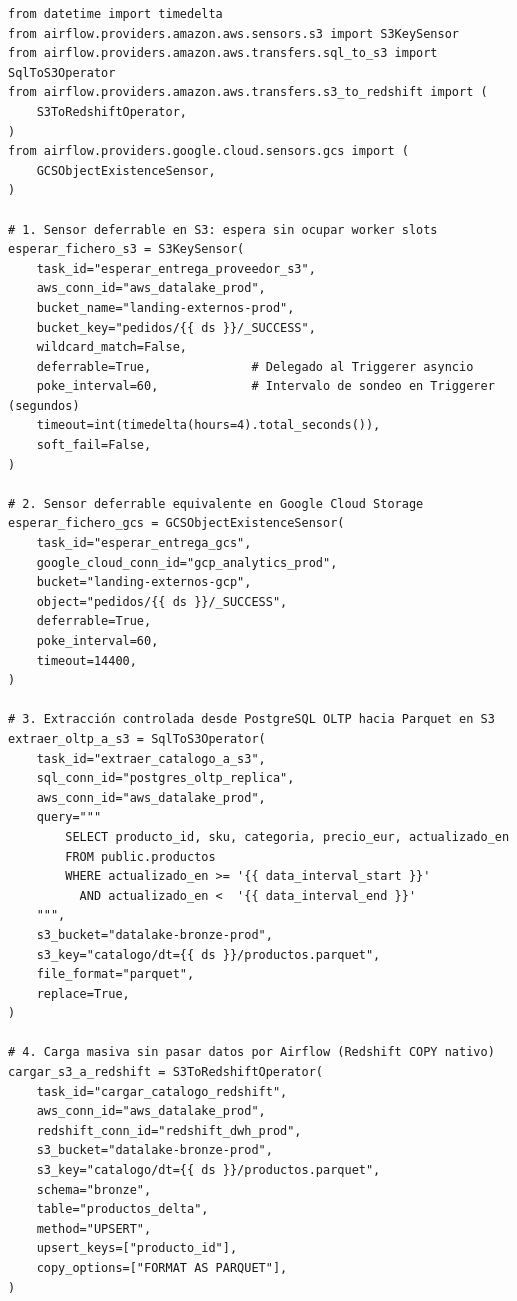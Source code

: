 \begin{lstlisting}[style=python, caption={Transferencias estructuradas (\texttt{SqlToS3}, \texttt{S3ToRedshift}) y sensores de objetos \textit{deferrables}.}, label={lst:transfers-y-sensores-storage}]
from datetime import timedelta
from airflow.providers.amazon.aws.sensors.s3 import S3KeySensor
from airflow.providers.amazon.aws.transfers.sql_to_s3 import SqlToS3Operator
from airflow.providers.amazon.aws.transfers.s3_to_redshift import (
    S3ToRedshiftOperator,
)
from airflow.providers.google.cloud.sensors.gcs import (
    GCSObjectExistenceSensor,
)

# 1. Sensor deferrable en S3: espera sin ocupar worker slots
esperar_fichero_s3 = S3KeySensor(
    task_id="esperar_entrega_proveedor_s3",
    aws_conn_id="aws_datalake_prod",
    bucket_name="landing-externos-prod",
    bucket_key="pedidos/{{ ds }}/_SUCCESS",
    wildcard_match=False,
    deferrable=True,              # Delegado al Triggerer asyncio
    poke_interval=60,             # Intervalo de sondeo en Triggerer (segundos)
    timeout=int(timedelta(hours=4).total_seconds()),
    soft_fail=False,
)

# 2. Sensor deferrable equivalente en Google Cloud Storage
esperar_fichero_gcs = GCSObjectExistenceSensor(
    task_id="esperar_entrega_gcs",
    google_cloud_conn_id="gcp_analytics_prod",
    bucket="landing-externos-gcp",
    object="pedidos/{{ ds }}/_SUCCESS",
    deferrable=True,
    poke_interval=60,
    timeout=14400,
)

# 3. Extracción controlada desde PostgreSQL OLTP hacia Parquet en S3
extraer_oltp_a_s3 = SqlToS3Operator(
    task_id="extraer_catalogo_a_s3",
    sql_conn_id="postgres_oltp_replica",
    aws_conn_id="aws_datalake_prod",
    query="""
        SELECT producto_id, sku, categoria, precio_eur, actualizado_en
        FROM public.productos
        WHERE actualizado_en >= '{{ data_interval_start }}'
          AND actualizado_en <  '{{ data_interval_end }}'
    """,
    s3_bucket="datalake-bronze-prod",
    s3_key="catalogo/dt={{ ds }}/productos.parquet",
    file_format="parquet",
    replace=True,
)

# 4. Carga masiva sin pasar datos por Airflow (Redshift COPY nativo)
cargar_s3_a_redshift = S3ToRedshiftOperator(
    task_id="cargar_catalogo_redshift",
    aws_conn_id="aws_datalake_prod",
    redshift_conn_id="redshift_dwh_prod",
    s3_bucket="datalake-bronze-prod",
    s3_key="catalogo/dt={{ ds }}/productos.parquet",
    schema="bronze",
    table="productos_delta",
    method="UPSERT",
    upsert_keys=["producto_id"],
    copy_options=["FORMAT AS PARQUET"],
)
\end{lstlisting}


